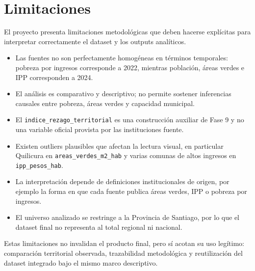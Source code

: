 \chapter{Limitaciones}

El proyecto presenta limitaciones metodológicas que deben hacerse explícitas para interpretar correctamente el dataset y los outputs analíticos.

\begin{itemize}
\item Las fuentes no son perfectamente homogéneas en términos temporales: pobreza por ingresos corresponde a 2022, mientras población, áreas verdes e IPP corresponden a 2024.
\item El análisis es comparativo y descriptivo; no permite sostener inferencias causales entre pobreza, áreas verdes y capacidad municipal.
\item El \texttt{indice\_rezago\_territorial} es una construcción auxiliar de Fase 9 y no una variable oficial provista por las instituciones fuente.
\item Existen outliers plausibles que afectan la lectura visual, en particular Quilicura en \texttt{areas\_verdes\_m2\_hab} y varias comunas de altos ingresos en \texttt{ipp\_pesos\_hab}.
\item La interpretación depende de definiciones institucionales de origen, por ejemplo la forma en que cada fuente publica áreas verdes, IPP o pobreza por ingresos.
\item El universo analizado se restringe a la Provincia de Santiago, por lo que el dataset final no representa al total regional ni nacional.
\end{itemize}

Estas limitaciones no invalidan el producto final, pero sí acotan su uso legítimo: comparación territorial observada, trazabilidad metodológica y reutilización del dataset integrado bajo el mismo marco descriptivo.
